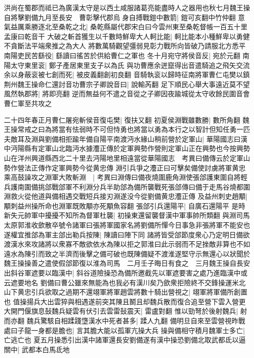 洪尚在蜀郡而祗已為廣漢太守是以西土咸服諸葛亮能盡時人之器用也秋七月魏王操自將擊劉備九月至長安　曹彰擊代郡烏身自搏戰鎧中數箭|{
	鎧可亥翻中竹仲翻}
意氣益厲乘勝逐北至桑乾之北|{
	桑乾縣屬代郡宋白曰今雲州東至桑乾督帳一百五十里孟康曰乾音干}
大破之斬首獲生以千數時鮮卑大人軻比能|{
	軻比能本小種鮮卑以勇健不貪斷法平端衆推之為大人}
將數萬騎觀望彊弱見彰力戰所向皆破乃請服北方悉平　南陽吏民苦繇役|{
	繇讀曰徭苦於供給曹仁之軍也}
冬十月宛守將侯音反|{
	宛於元翻}
南陽太守東里衮|{
	鄭子產居東里支子以為氏}
與功曹應余迸竄得出音遣騎追之飛矢交流余以身蔽衮被七創而死|{
	被皮義翻創初良翻}
音騎執衮以歸時征南將軍曹仁屯樊以鎮荆州魏王操命仁還討音功曹宗子卿說音曰|{
	說輸芮翻}
足下順民心舉大事遠近莫不望風然執郡將|{
	將即亮翻}
逆而無益何不遣之音從之子卿因夜踰城從太守收餘民圍音會曹仁軍至共攻之

二十四年春正月曹仁屠宛斬侯音復屯樊|{
	復扶又翻}
初夏侯淵戰雖數勝|{
	數所角翻}
魏王操常戒之曰為將當有怯弱時不可但恃勇也將當以勇為本行之以智計但知任勇一匹夫敵耳及淵與劉備相拒踰年備自陽平南渡沔水緣山稍前營於定軍山|{
	華陽國志曰漢中沔陽縣有定軍山北臨沔水據灋正傳於定軍興勢作營則定軍山正在興勢也今按興勢山在洋州興道縣西北二十里去沔陽地里相遠當從華陽國志　考異曰備傳云於定軍山勢作營法正傳作定軍興勢今從黄忠傳}
淵引兵爭之灋正曰可擊矣備使討虜將軍黄忠乘高鼓譟攻之淵軍大敗斬淵　|{
	考異曰淵傳曰備夜燒圍鹿角淵使張郃護東圍自將輕兵護南圍備挑郃戰郃軍不利淵分兵半助郃為備所襲戰死張郃傳曰備于走馬谷燒都圍淵救火從他道與備相遇交戰短兵接刃淵遂没今從劉備黄忠灋正傳}
及益州刺史趙顒|{
	顒刺益州操所命也淵軍既敗顒亦死顒魚容翻}
張郃引兵還陽平|{
	自廣石還陽平}
是時新失元帥軍中擾擾不知所為督軍杜襲|{
	初操東還留襲督漢中軍事帥所類翻}
與淵司馬太原郭淮收歛散卒號令諸軍曰張將軍國家名將劉備所憚今日事急非張將軍不能安也遂權宜推郃為軍主郃出勒兵按陳|{
	陳讀曰陣下同}
諸將皆受郃節度衆心乃定明日備欲渡漢水來攻諸將以衆寡不敵欲依水為陳以拒之郭淮曰此示弱而不足挫敵非算也不如遠水為陳引而致之半濟而後擊之備可破也既陳備疑不渡淮遂堅守示無還心以狀聞於魏王操操善之遣使假郃節復以淮為司馬　二月壬子晦日有食之　三月魏王操自長安出斜谷軍遮要以臨漢中|{
	斜谷道險操恐為備所邀截先以軍遮要害之處乃進臨漢中或云遮要地名}
劉備曰曹公雖來無能為也我必有漢川矣乃歛衆拒險終不交鋒操運米北山下黄忠引兵欲取之過期不還翊軍將軍趙雲將數十騎出營視之|{
	翊軍將軍備所創置也}
值操揚兵大出雲猝與相遇遂前突其陳且鬭且却魏兵散而復合追至營下雲入營更大開門偃旗息鼔魏兵疑雲有伏引去雲雷鼔震天|{
	雷盧對翻}
惟以勁弩於後射魏兵|{
	射而亦翻}
魏兵驚駭自相蹂踐墯漢水中死者甚多|{
	蹂人九翻}
備明旦自來至雲營視昨戰處曰子龍一身都是膽也|{
	言其膽大能以孤軍亢操大兵}
操與備相守積月魏軍士多亡|{
	亡逃亡也}
夏五月操悉引出漢中諸軍還長安劉備遂有漢中操恐劉備北取武都氐以逼關中|{
	武都本白馬氐地}
